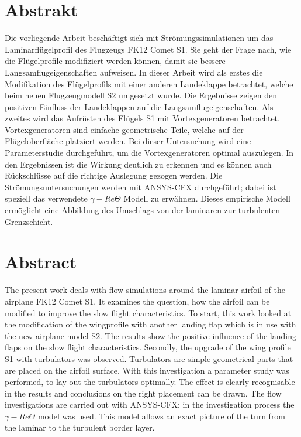 \section*{Abstrakt}
\label{sec:abstrakt}

Die vorliegende Arbeit beschäftigt sich mit Strömungssimulationen um das Laminarflügelprofil des Flugzeugs FK12 Comet S1. Sie geht der Frage nach, wie die Flügelprofile modifiziert werden können, damit sie bessere Langsamflugeigenschaften aufweisen. 
In dieser Arbeit wird als erstes die Modifikation des Flügelprofils mit einer anderen Landeklappe betrachtet, welche beim neuen Flugzeugmodell S2 umgesetzt wurde. Die Ergebnisse zeigen den positiven Einfluss der Landeklappen auf die Langsamflugeigenschaften. Als zweites wird das Aufrüsten des Flügels S1 mit Vortexgeneratoren betrachtet. Vortexgeneratoren sind einfache geometrische Teile, welche auf der Flügeloberfläche platziert werden. Bei dieser Untersuchung wird eine Parameterstudie durchgeführt, um die Vortexgeneratoren optimal auszulegen. In den Ergebnissen ist die Wirkung deutlich zu erkennen und es können auch Rückschlüsse auf die richtige Auslegung gezogen werden. 
Die Strömungsuntersuchungen werden mit ANSYS-CFX durchgeführt; dabei ist speziell das verwendete $\gamma-Re \Theta$ Modell zu erwähnen. Dieses empirische Modell ermöglicht eine Abbildung des Umschlags von der laminaren zur turbulenten Grenzschicht.

\newpage


\section*{Abstract}
\label{sec:abstract}


The present work deals with flow simulations around the laminar airfoil of the airplane FK12 Comet S1. It examines the question, how the airfoil can be modified to improve the slow flight characteristics. 
To start, this work looked at the modification of the wingprofile with another landing flap which is in use with the new airplane model S2. The results show the positive influence of the landing flaps on the slow flight characteristics. Secondly, the upgrade of the wing profile S1 with turbulators was observed. Turbulators are simple geometrical parts that are placed on the airfoil surface. With this investigation a parameter study was performed, to lay out the turbulators optimally. The effect is clearly recognisable in the results and conclusions on the right placement can be drawn. 
The flow investigations are carried out with ANSYS-CFX; in the investigation process the $\gamma-Re \Theta$ model was used. This model allows an exact picture of the turn from the laminar to the turbulent border layer.
